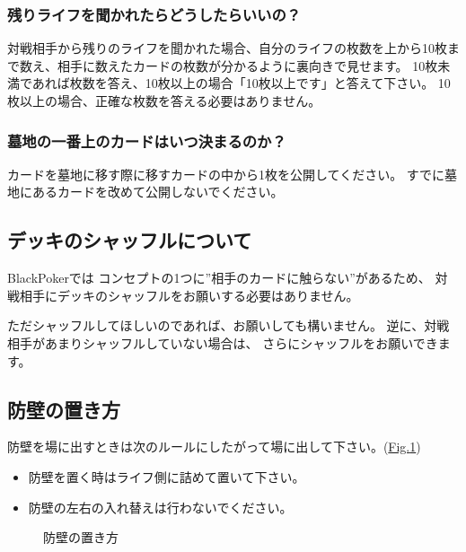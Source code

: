 \documentclass[letterpaper,10pt,dvipdfmx]{sphinxmanual}
\begin{document}
\subsubsection{残りライフを聞かれたらどうしたらいいの？}
\label{\detokenize{common/common:id38}}
\sphinxAtStartPar
対戦相手から残りのライフを聞かれた場合、自分のライフの枚数を上から10枚まで数え、相手に数えたカードの枚数が分かるように裏向きで見せます。
10枚未満であれば枚数を答え、10枚以上の場合「10枚以上です」と答えて下さい。
10枚以上の場合、正確な枚数を答える必要はありません。


\subsubsection{墓地の一番上のカードはいつ決まるのか？}
\label{\detokenize{common/common:id39}}
\sphinxAtStartPar
カードを墓地に移す際に移すカードの中から1枚を公開してください。
すでに墓地にあるカードを改めて公開しないでください。


\subsection{デッキのシャッフルについて}
\label{\detokenize{common/common:id40}}
\sphinxAtStartPar
BlackPokerでは
コンセプトの1つに”相手のカードに触らない”があるため、
対戦相手にデッキのシャッフルをお願いする必要はありません。

\sphinxAtStartPar
ただシャッフルしてほしいのであれば、お願いしても構いません。
逆に、対戦相手があまりシャッフルしていない場合は、
さらにシャッフルをお願いできます。


\subsection{防壁の置き方}
\label{\detokenize{common/common:id41}}
\sphinxAtStartPar
防壁を場に出すときは次のルールにしたがって場に出して下さい。(\hyperref[\detokenize{common/common:set-bulwork}]{Fig.\@ \ref{\detokenize{common/common:set-bulwork}}})
\begin{itemize}
\item {} 
\sphinxAtStartPar
防壁を置く時はライフ側に詰めて置いて下さい。

\item {} 
\sphinxAtStartPar
防壁の左右の入れ替えは行わないでください。

\end{itemize}

\begin{figure}[htbp]
\centering
\capstart

\noindent{}
\caption{防壁の置き方}\label{\detokenize{common/common:id50}}\label{\detokenize{common/common:set-bulwork}}\end{figure}
\end{document}
